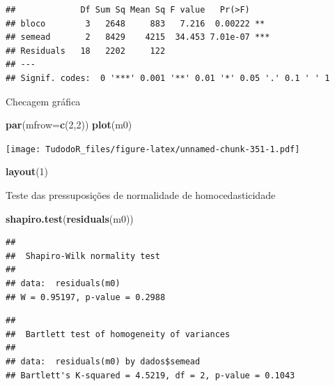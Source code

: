 \documentclass[
]{book}
\newenvironment{Shaded}{\begin{snugshade}}{\end{snugshade}}
\newcommand{\DataTypeTok}[1]{\textcolor[rgb]{0.13,0.29,0.53}{#1}}
\newcommand{\DecValTok}[1]{\textcolor[rgb]{0.00,0.00,0.81}{#1}}
\newcommand{\KeywordTok}[1]{\textcolor[rgb]{0.13,0.29,0.53}{\textbf{#1}}}
\newcommand{\NormalTok}[1]{#1}
\newcommand{\OperatorTok}[1]{\textcolor[rgb]{0.81,0.36,0.00}{\textbf{#1}}}
\begin{document}
\begin{verbatim}
##             Df Sum Sq Mean Sq F value   Pr(>F)    
## bloco        3   2648     883   7.216  0.00222 ** 
## semead       2   8429    4215  34.453 7.01e-07 ***
## Residuals   18   2202     122                     
## ---
## Signif. codes:  0 '***' 0.001 '**' 0.01 '*' 0.05 '.' 0.1 ' ' 1
\end{verbatim}

Checagem gráfica

\begin{Shaded}
\begin{Highlighting}[]
\KeywordTok{par}\NormalTok{(}\DataTypeTok{mfrow=}\KeywordTok{c}\NormalTok{(}\DecValTok{2}\NormalTok{,}\DecValTok{2}\NormalTok{))}
\KeywordTok{plot}\NormalTok{(m0)}
\end{Highlighting}
\end{Shaded}

\texttt{[image: TudodoR\_files/figure-latex/unnamed-chunk-351-1.pdf]}

\begin{Shaded}
\begin{Highlighting}[]
\KeywordTok{layout}\NormalTok{(}\DecValTok{1}\NormalTok{)}
\end{Highlighting}
\end{Shaded}

Teste das pressuposições de normalidade de homocedasticidade

\begin{Shaded}
\begin{Highlighting}[]
\KeywordTok{shapiro.test}\NormalTok{(}\KeywordTok{residuals}\NormalTok{(m0))}
\end{Highlighting}
\end{Shaded}

\begin{verbatim}
## 
##  Shapiro-Wilk normality test
## 
## data:  residuals(m0)
## W = 0.95197, p-value = 0.2988
\end{verbatim}

\begin{Shaded}
\end{Shaded}

\begin{verbatim}
## 
##  Bartlett test of homogeneity of variances
## 
## data:  residuals(m0) by dados$semead
## Bartlett's K-squared = 4.5219, df = 2, p-value = 0.1043
\end{verbatim}
\end{document}
